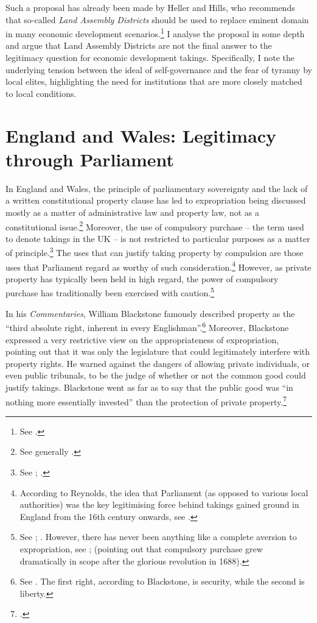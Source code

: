 Such a proposal has already been made by Heller and Hills, who recommends that so-called {\it Land Assembly Districts} should be used to replace eminent domain in many economic development scenarios.\footnote{See \cite{heller08}.} I analyse the proposal in some depth and argue that Land Assembly Districts are not the final answer to the legitimacy question for economic development takings. Specifically, I note the underlying tension between the ideal of self-governance and the fear of tyranny by local elites, highlighting the need for institutions that are more closely matched to local conditions.

\section{England and Wales: Legitimacy through Parliament}\label{sec:3:2}

In England and Wales, the principle of parliamentary sovereignty and the lack of a written constitutional property clause has led to expropriation being discussed mostly as a matter of administrative law and property law, not as a constitutional issue.\footnote{See generally \cite{taggart98}.} Moreover, the use of compulsory purchase -- the term used to denote takings in the UK -- is not restricted to particular purposes as a matter of principle.\footnote{See \cite[201]{allen00}; \cite[48-49]{waring09}.} The uses that can justify taking property by compulsion are those uses that Parliament regard as worthy of such consideration.\footnote{According to Reynolds, the idea that Parliament (as opposed to various local authorities) was the key legitimising force behind takings gained ground in England from the 16th century onwards, see \cite[41-42]{reynolds10}.} However, as private property has typically been held in high regard, the power of compulsory purchase has traditionally been exercised with caution.\footnote{See \cite[15]{allen00}; \cite[47-48]{waring09}. However, there has never been anything like a complete aversion to expropriation, see \cite[34-46]{reynolds10}; \cite[126-128]{hoppit11} (pointing out that compulsory purchase grew dramatically in scope after the glorious revolution in 1688).}

In his {\it Commentaries}, William Blackstone famously described property as the ``third absolute right, inherent in every Englishman''.\footnote{See \cite[134-135]{blackstone79}. The first right, according to Blackstone, is security, while the second is liberty.} Moreover, Blackstone expressed a very restrictive view on the appropriateness of expropriation, pointing out that it was only the legislature that could legitimately interfere with property rights. He warned against the dangers of allowing private individuals, or even public tribunals, to be the judge of whether or not the common good could justify takings. Blackstone went as far as to say that the public good was ``in nothing more essentially invested'' than the protection of private property.\footcite[134-135]{blackstone79}

